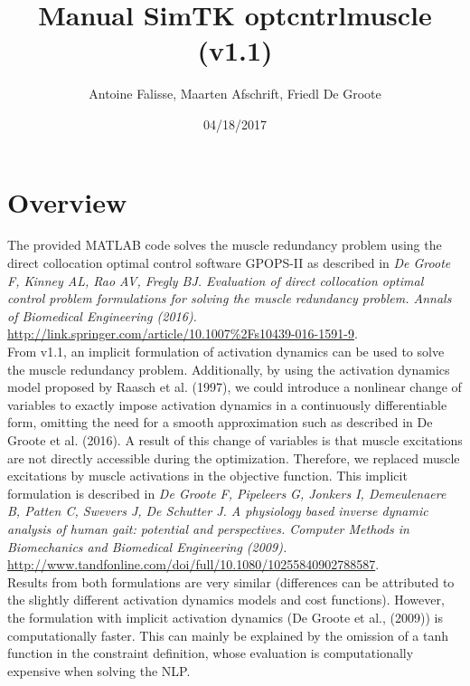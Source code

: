 \documentclass[a4paper,oneside,11pt]{article}
\begin{document}
\title{Manual SimTK optcntrlmuscle (v1.1)}
\author{Antoine Falisse, Maarten Afschrift, Friedl De Groote}
\date{04/18/2017} 
\maketitle
\tableofcontents

\section{Overview}

The provided MATLAB code solves the muscle redundancy problem using the direct collocation optimal control software GPOPS-II as described in \textit{De Groote F, Kinney AL, Rao AV, Fregly BJ. Evaluation of direct collocation optimal control problem formulations for solving the muscle redundancy problem. Annals of Biomedical Engineering (2016).} \url{http://link.springer.com/article/10.1007%2Fs10439-016-1591-9}. 
\\

From v1.1, an implicit formulation of activation dynamics can be used to solve the muscle redundancy problem. Additionally, by using the activation dynamics model proposed by Raasch et al. (1997), we could introduce a nonlinear change of variables to exactly impose activation dynamics in a continuously differentiable form, omitting the need for a smooth approximation such as described in De Groote et al. (2016). A result of this change of variables is that muscle excitations are not directly accessible during the optimization. Therefore, we replaced muscle excitations by muscle activations in the objective function. This implicit formulation is described in \textit{De Groote F, Pipeleers G, Jonkers I, Demeulenaere B, Patten C, Swevers J, De Schutter J. A physiology based inverse dynamic analysis of human gait: potential and perspectives. Computer Methods in Biomechanics and Biomedical Engineering (2009).} \url{http://www.tandfonline.com/doi/full/10.1080/10255840902788587}.  \\

Results from both formulations are very similar (differences can be attributed to the slightly different activation dynamics models and cost functions). However, the formulation with implicit activation dynamics (De Groote et al., (2009)) is computationally faster. This can mainly be explained by the omission of a tanh function in the constraint definition, whose evaluation is computationally expensive when solving the NLP.
\end{document}
